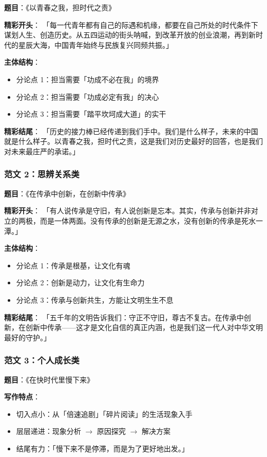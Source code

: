 \textbf{题目}：《以青春之我，担时代之责》

\textbf{精彩开头}：
「每一代青年都有自己的际遇和机缘，都要在自己所处的时代条件下谋划人生、创造历史。从五四运动的街头呐喊，到改革开放的创业浪潮，再到新时代的星辰大海，中国青年始终与民族复兴同频共振。」

\textbf{主体结构}：
\begin{itemize}
  \item 分论点 1：担当需要「功成不必在我」的境界
  \item 分论点 2：担当需要「功成必定有我」的决心
  \item 分论点 3：担当需要「踏平坎坷成大道」的实干
\end{itemize}

\textbf{精彩结尾}：
「历史的接力棒已经传递到我们手中。我们是什么样子，未来的中国就是什么样子。以青春之我，担时代之责，这是我们对历史最好的回答，也是我们对未来最庄严的承诺。」

\subsubsection{范文 2：思辨关系类}

\textbf{题目}：《在传承中创新，在创新中传承》

\textbf{精彩开头}：
「有人说传承是守旧，有人说创新是忘本。其实，传承与创新并非对立的两极，而是一体两面。没有传承的创新是无源之水，没有创新的传承是死水一潭。」

\textbf{主体结构}：
\begin{itemize}
  \item 分论点 1：传承是根基，让文化有魂
  \item 分论点 2：创新是动力，让文化有生命力
  \item 分论点 3：传承与创新共生，方能让文明生生不息
\end{itemize}

\textbf{精彩结尾}：
「五千年的文明告诉我们：守正不守旧，尊古不复古。在传承中创新，在创新中传承——这才是文化自信的真正内涵，也是我们这一代人对中华文明最好的守护。」

\subsubsection{范文 3：个人成长类}

\textbf{题目}：《在快时代里慢下来》

\textbf{写作特点}：
\begin{itemize}
  \item 切入点小：从「倍速追剧」「碎片阅读」的生活现象入手
  \item 层层递进：现象分析 $\to$ 原因探究 $\to$ 解决方案
  \item 结尾有力：「慢下来不是停滞，而是为了更好地出发。」
\end{itemize}

